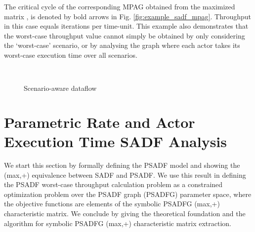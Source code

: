 \documentclass[]{eptcs}
\begin{document}
The critical cycle of the corresponding MPAG obtained from the maximized matrix  , is denoted by bold arrows in Fig. \ref{fig:example_sadf_mpag}. Throughput in this case equals  iterations per time-unit. This example also demonstrates that the worst-case throughput value cannot simply be obtained by only considering the `worst-case' scenario, or by analysing the graph where each actor takes its worst-case execution time over all scenarios.
\begin{figure}[t]\centering
	~~~~~~~~~~~~~~~
	\caption{Scenario-aware dataflow}\label{fig:sadf}\end{figure}
\section{Parametric Rate and Actor Execution Time SADF Analysis}
We start this section by formally defining the PSADF model and showing the (max,+) equivalence between SADF and PSADF. We use this result in defining the PSADF worst-case throughput calculation problem as a constrained optimization problem over the PSADF graph (PSADFG) parameter space, where the objective functions are elements of the symbolic PSADFG (max,+) characteristic matrix. We conclude by giving the theoretical foundation and the algorithm for symbolic PSADFG (max,+) characteristic matrix extraction. 
\end{document}

